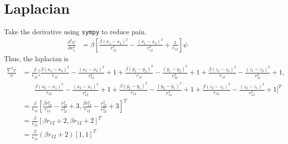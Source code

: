\section{Laplacian}
Take the derivative using \texttt{sympy} to reduce pain.
\begin{align}
\frac{\partial^2 \psi}{\partial x_1^2} &= \beta \left[\frac{\beta(x_1 - x_2)^2}{r_{12}^2} - \frac{(x_1 - x_2)^2}{r_{12}^3} + \frac{1}{r_{12}}\right] \psi
\end{align}
Thus, the laplacian is
\begin{align}
\frac{\nabla^2 \psi}{\psi} &= \frac{\beta}{r_{12}} 
\biggl[
\frac{\beta(x_1 - x_2)^2}{r_{12}} - \frac{(x_1 - x_2)^2}{r_{12}^2} + 1 + 
\frac{\beta(y_1 - y_2)^2}{r_{12}} - \frac{(y_1 - y_2)^2}{r_{12}^2} + 1 + 
\frac{\beta(z_1 - z_2)^2}{r_{12}} - \frac{(z_1 - z_2)^2}{r_{12}^2} + 1, \\
&~~~~~~~~\frac{\beta(x_2 - x_1)^2}{r_{12}} - \frac{(x_2 - x_1)^2}{r_{12}^2} + 1 + 
\frac{\beta(y_2 - y_1)^2}{r_{12}} - \frac{(y_2 - y_1)^2}{r_{12}^2} + 1 + 
\frac{\beta(z_2 - z_1)^2}{r_{12}} - \frac{(z_2 - z_1)^2}{r_{12}^2} + 1
\biggr]^T \\
&= \frac{\beta}{r_{12}} 
\left[
\frac{\beta r_{12}^2}{r_{12}} - \frac{r_{12}^2}{r_{12}^2} + 3, 
\frac{\beta r_{12}^2}{r_{12}} - \frac{r_{12}^2}{r_{12}^2} + 3
\right]^T \\
&= \frac{\beta}{r_{12}} [\beta r_{12} + 2, \beta r_{12} + 2]^T \\
&= \frac{\beta}{r_{12}} (\beta r_{12} + 2)[1, 1]^T \\
\end{align}
